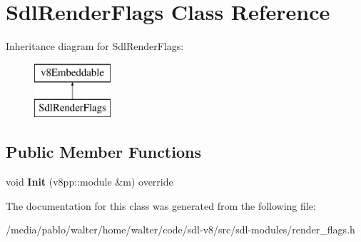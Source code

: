 \hypertarget{classSdlRenderFlags}{}\section{Sdl\+Render\+Flags Class Reference}
\label{classSdlRenderFlags}
Inheritance diagram for Sdl\+Render\+Flags\+:\begin{figure}[H]
\begin{center}
\leavevmode
\includegraphics[height=2.000000cm]{classSdlRenderFlags}
\end{center}
\end{figure}
\subsection*{Public Member Functions}
\begin{DoxyCompactItemize}
\item 
\mbox{\label{classSdlRenderFlags_acd26dab714481395f7b297d08388ff97}} 
void {\bfseries Init} (v8pp\+::module \&m) override
\end{DoxyCompactItemize}


The documentation for this class was generated from the following file\+:\begin{DoxyCompactItemize}
\item 
/media/pablo/walter/home/walter/code/sdl-\/v8/src/sdl-\/modules/render\+\_\+flags.\+h\end{DoxyCompactItemize}
